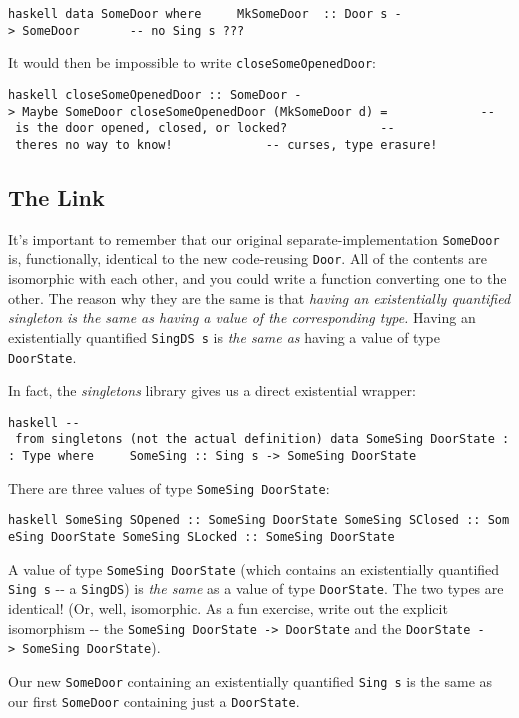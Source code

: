 \documentclass[]{article}
\begin{document}
\texttt{haskell\ data\ SomeDoor\ where\ \ \ \ \ MkSomeDoor\ \ ::\ Door\ s\ -\textgreater{}\ SomeDoor\ \ \ \ \ \ \ -\/-\ no\ Sing\ s\ ???}

It would then be impossible to write \texttt{closeSomeOpenedDoor}:

\texttt{haskell\ closeSomeOpenedDoor\ ::\ SomeDoor\ -\textgreater{}\ Maybe\ SomeDoor\ closeSomeOpenedDoor\ (MkSomeDoor\ d)\ =\ \ \ \ \ \ \ \ \ \ \ \ \ -\/-\ is\ the\ door\ opened,\ closed,\ or\ locked?\ \ \ \ \ \ \ \ \ \ \ \ \ -\/-\ there\textquotesingle{}s\ no\ way\ to\ know!\ \ \ \ \ \ \ \ \ \ \ \ \ -\/-\ curses,\ type\ erasure!}

\subsection{The Link}

It's important to remember that our original separate-implementation
\texttt{SomeDoor} is, functionally, identical to the new code-reusing
\texttt{Door}. All of the contents are isomorphic with each other, and you could
write a function converting one to the other. The reason why they are the same
is that \emph{having an existentially quantified singleton is the same as having
a value of the corresponding type.} Having an existentially quantified
\texttt{SingDS\ s} is \emph{the same as} having a value of type
\texttt{DoorState}.

In fact, the \emph{singletons} library gives us a direct existential wrapper:

\texttt{haskell\ -\/-\ from\ singletons\ (not\ the\ actual\ definition)\ data\ SomeSing\ DoorState\ ::\ Type\ where\ \ \ \ \ SomeSing\ ::\ Sing\ s\ -\textgreater{}\ SomeSing\ DoorState}

There are three values of type \texttt{SomeSing\ DoorState}:

\texttt{haskell\ SomeSing\ SOpened\ ::\ SomeSing\ DoorState\ SomeSing\ SClosed\ ::\ SomeSing\ DoorState\ SomeSing\ SLocked\ ::\ SomeSing\ DoorState}

A value of type \texttt{SomeSing\ DoorState} (which contains an existentially
quantified \texttt{Sing\ s} -\/- a \texttt{SingDS}) is \emph{the same} as a
value of type \texttt{DoorState}. The two types are identical! (Or, well,
isomorphic. As a fun exercise, write out the explicit isomorphism -\/- the
\texttt{SomeSing\ DoorState\ -\textgreater{}\ DoorState} and the
\texttt{DoorState\ -\textgreater{}\ SomeSing\ DoorState}).

Our new \texttt{SomeDoor} containing an existentially quantified
\texttt{Sing\ s} is the same as our first \texttt{SomeDoor} containing just a
\texttt{DoorState}.
\end{document}
